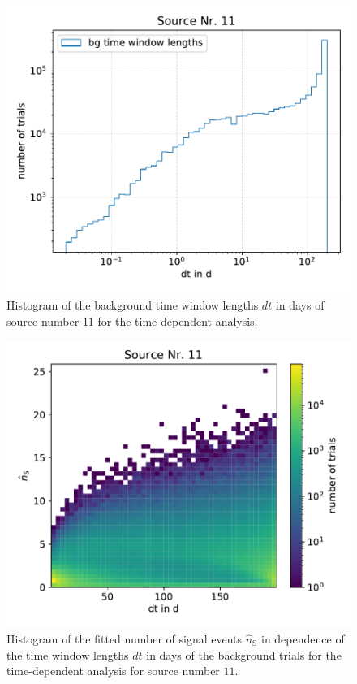\begin{figure}
    \centering
    \includegraphics[width=\linewidth]{Plots/05_csky/9_years_gfu_gold_time_dep_bg_dt_1.pdf}
    \caption{Histogram of the background time window lengths $dt$ in days of source number $\num{11}$ for the time-dependent analysis.}
    \label{fig:bg_trials_time_dep_time_windows_1}
\end{figure}
\begin{figure}
    \centering
    \includegraphics[width=\linewidth]{Plots/05_csky/time_window_ns_bg_time_dep_1.pdf}
    \caption{Histogram of the fitted number of signal events $\hat{n}_\text{S}$ in dependence of the time window lengths $dt$ in days of the background trials for the time-dependent analysis for source number $\num{11}$.}
    \label{fig:bg_trials_time_dep_time_windows_ns_1}
\end{figure}

